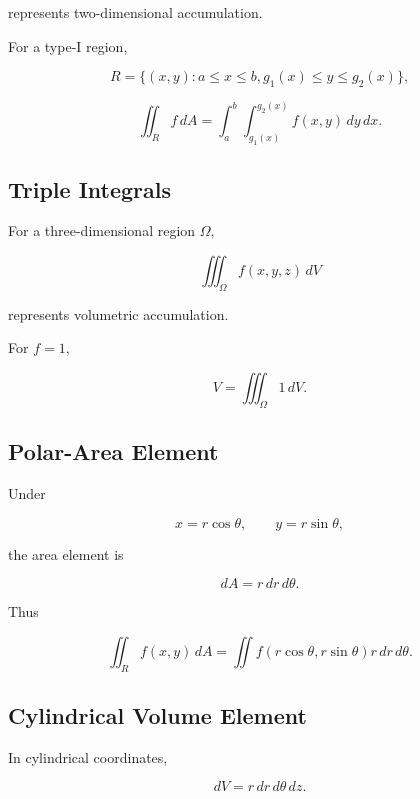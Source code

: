 represents two-dimensional accumulation.

For a type-I region,

\[
R
=
\{
(x,y):
a\leq x\leq b,
g_1(x)\leq y\leq g_2(x)
\},
\]

\[
\boxed{
\iint_R
f\,dA
=
\int_a^b
\int_{g_1(x)}^{g_2(x)}
f(x,y)
\,dy\,dx.
}
\]

\subsection{Triple Integrals}
\label{subsec:triple-integral-reference}

For a three-dimensional region \(\Omega\),

\[
\boxed{
\iiint_\Omega
f(x,y,z)
\,dV
}
\]

represents volumetric accumulation.

For \(f=1\),

\[
\boxed{
V
=
\iiint_\Omega
1\,dV.
}
\]

\subsection{Polar-Area Element}
\label{subsec:polar-area-element-reference}

Under

\[
x=r\cos\theta,
\qquad
y=r\sin\theta,
\]

the area element is

\[
\boxed{
dA
=
r\,dr\,d\theta.
}
\]

Thus

\[
\boxed{
\iint_R
f(x,y)\,dA
=
\iint
f(r\cos\theta,r\sin\theta)
r\,dr\,d\theta.
}
\]

\subsection{Cylindrical Volume Element}
\label{subsec:cylindrical-volume-element}

In cylindrical coordinates,

\[
\boxed{
dV
=
r\,dr\,d\theta\,dz.
}
\]

